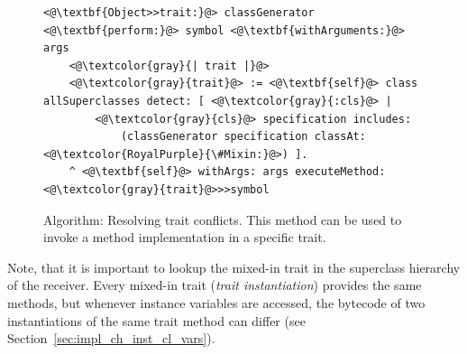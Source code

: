 \begin{figure}[!htp]
\begin{lstlisting}
<@\textbf{Object>>trait:}@> classGenerator <@\textbf{perform:}@> symbol <@\textbf{withArguments:}@> args
    <@\textcolor{gray}{| trait |}@>
    <@\textcolor{gray}{trait}@> := <@\textbf{self}@> class allSuperclasses detect: [ <@\textcolor{gray}{:cls}@> |
        <@\textcolor{gray}{cls}@> specification includes: 
            (classGenerator specification classAt: <@\textcolor{RoyalPurple}{\#Mixin:}@>) ].
    ^ <@\textbf{self}@> withArgs: args executeMethod: <@\textcolor{gray}{trait}@>>>symbol
\end{lstlisting}
\caption[Algorithm: Resolving trait conflicts]{Algorithm: Resolving trait conflicts. This method can be used to invoke a method implementation in a specific trait.}
\label{fig:algo_trait_res}
\end{figure}

Note, that it is important to lookup the mixed-in trait in the superclass hierarchy of the receiver. Every mixed-in trait (\emph{trait instantiation}) provides the same methods, but whenever instance variables are accessed, the bytecode of two instantiations of the same trait method can differ (see Section~\ref{sec:impl_ch_inst_cl_vars}).

